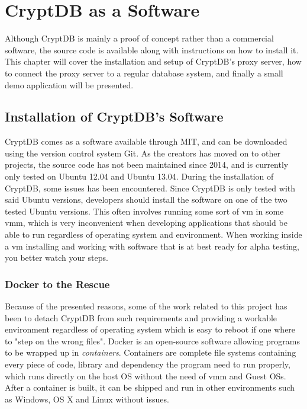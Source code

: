 \chapter{CryptDB as a Software}
\label{chp:software}

Although CryptDB is mainly a proof of concept rather than a commercial software, the source code is available along with instructions on how to install it. This chapter will cover the installation and setup of CryptDB's proxy server, how to connect the proxy server to a regular database system, and finally a small demo application will be presented.

\section{Installation of CryptDB's Software}

CryptDB comes as a software available through MIT, and can be downloaded using the version control system Git. As the creators has moved on to other projects, the source code has not been maintained since 2014, and is currently only tested on Ubuntu 12.04 and Ubuntu 13.04. During the installation of CryptDB, some issues has been encountered. Since CryptDB is only tested with said Ubuntu versions, developers should install the software on one of the two tested Ubuntu versions. This often involves running some sort of \gls{vm} in some \gls{vmm}, which is very inconvenient when developing applications that should be able to run regardless of operating system and environment. When working inside a \gls{vm} installing and working with software that is at best ready for alpha testing, you better watch your steps. 

\subsection{Docker to the Rescue}

Because of the presented reasons, some of the work related to this project has been to detach CryptDB from such requirements and providing a workable environment regardless of operating system which is easy to reboot if one where to "step on the wrong files". Docker \cite{docker_homepage} is an open-source software allowing programs to be wrapped up in \emph{containers}. Containers are complete file systems containing every piece of code, 
library and dependency the program need to run properly, which runs directly on the host OS without the need of \gls{vmm} and Guest OSs. After a container is built, it can be shipped and run in other environments such as Windows, OS X and Linux without issues.

